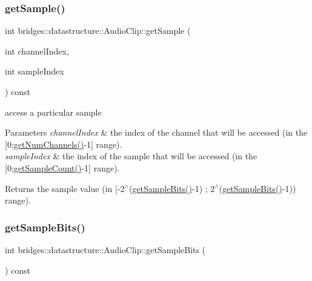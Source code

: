 \subsubsection{\texorpdfstring{get\+Sample()}{getSample()}}
{\footnotesize\ttfamily int bridges\+::datastructure\+::\+Audio\+Clip\+::get\+Sample (\begin{DoxyParamCaption}\item[{int}]{channel\+Index,  }\item[{int}]{sample\+Index }\end{DoxyParamCaption}) const\hspace{0.3cm}{\ttfamily [inline]}}



access a particular sample 


\begin{DoxyParams}{Parameters}
{\em channel\+Index} & the index of the channel that will be accessed (in the \mbox{[}0;\hyperlink{classbridges_1_1datastructure_1_1_audio_clip_acc378f797b1b6e3cfb778c1ccdc23dba}{get\+Num\+Channels()}-\/1\mbox{]} range). \\
\hline
{\em sample\+Index} & the index of the sample that will be accessed (in the \mbox{[}0;\hyperlink{classbridges_1_1datastructure_1_1_audio_clip_aaaee4b34cd512c02a0c0ea072782a9d6}{get\+Sample\+Count()}-\/1\mbox{]} range). \\
\hline
\end{DoxyParams}
\begin{DoxyReturn}{Returns}
the sample value (in \mbox{[}-\/2$^\wedge$(\hyperlink{classbridges_1_1datastructure_1_1_audio_clip_aca7c5460d005d62a7a0d2eae595e63d3}{get\+Sample\+Bits()}-\/1) ; 2$^\wedge$(\hyperlink{classbridges_1_1datastructure_1_1_audio_clip_aca7c5460d005d62a7a0d2eae595e63d3}{get\+Sample\+Bits()}-\/1)) range). 
\end{DoxyReturn}
\mbox{\label{classbridges_1_1datastructure_1_1_audio_clip_aca7c5460d005d62a7a0d2eae595e63d3}} 
\subsubsection{\texorpdfstring{get\+Sample\+Bits()}{getSampleBits()}}
{\footnotesize\ttfamily int bridges\+::datastructure\+::\+Audio\+Clip\+::get\+Sample\+Bits (\begin{DoxyParamCaption}{ }\end{DoxyParamCaption}) const\hspace{0.3cm}{\ttfamily [inline]}}



